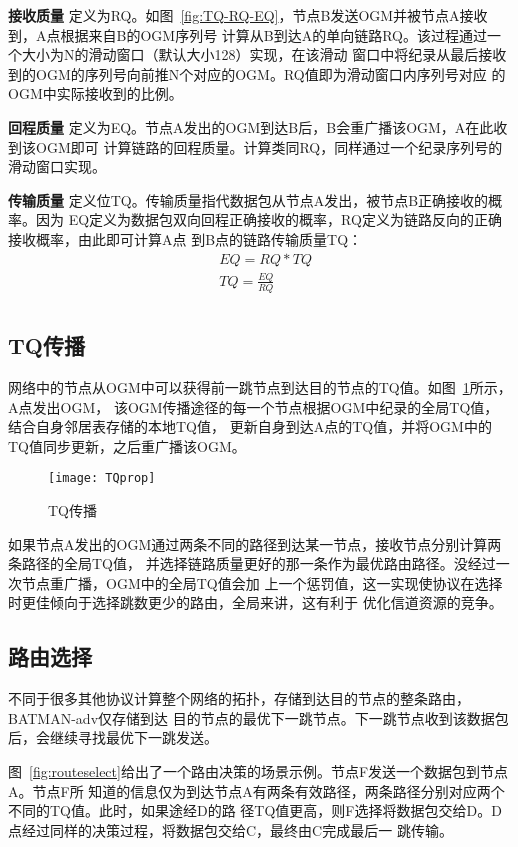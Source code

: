 \textbf{接收质量} 定义为RQ。如图~\ref{fig:TQ-RQ-EQ}，节点B发送OGM并被节点A接收到，A点根据来自B的OGM序列号
计算从B到达A的单向链路RQ。该过程通过一个大小为N的滑动窗口（默认大小128）实现，在该滑动
窗口中将纪录从最后接收到的OGM的序列号向前推N个对应的OGM。RQ值即为滑动窗口内序列号对应
的OGM中实际接收到的比例。

\textbf{回程质量} 定义为EQ。节点A发出的OGM到达B后，B会重广播该OGM，A在此收到该OGM即可
计算链路的回程质量。计算类同RQ，同样通过一个纪录序列号的滑动窗口实现。

\textbf{传输质量} 定义位TQ。传输质量指代数据包从节点A发出，被节点B正确接收的概率。因为
EQ定义为数据包双向回程正确接收的概率，RQ定义为链路反向的正确接收概率，由此即可计算A点
到B点的链路传输质量TQ：
\begin{equation}
\begin{split}
&EQ=RQ*TQ\\
&TQ=\frac{EQ}{RQ}\\
\end{split}
\end{equation}

\subsection{TQ传播}
网络中的节点从OGM中可以获得前一跳节点到达目的节点的TQ值。如图~\ref{fig:TQprop}所示，A点发出OGM，
该OGM传播途径的每一个节点根据OGM中纪录的全局TQ值，结合自身邻居表存储的本地TQ值，
更新自身到达A点的TQ值，并将OGM中的TQ值同步更新，之后重广播该OGM。

\begin{figure}[H] %
  \centering
  \texttt{[image: TQprop]}
  \caption{TQ传播}
  \label{fig:TQprop}
\end{figure}

如果节点A发出的OGM通过两条不同的路径到达某一节点，接收节点分别计算两条路径的全局TQ值，
并选择链路质量更好的那一条作为最优路由路径。没经过一次节点重广播，OGM中的全局TQ值会加
上一个惩罚值，这一实现使协议在选择时更佳倾向于选择跳数更少的路由，全局来讲，这有利于
优化信道资源的竞争。

\subsection{路由选择}
不同于很多其他协议计算整个网络的拓扑，存储到达目的节点的整条路由，BATMAN-adv仅存储到达
目的节点的最优下一跳节点。下一跳节点收到该数据包后，会继续寻找最优下一跳发送。

图~\ref{fig:routeselect}给出了一个路由决策的场景示例。节点F发送一个数据包到节点A。节点F所
知道的信息仅为到达节点A有两条有效路径，两条路径分别对应两个不同的TQ值。此时，如果途经D的路
径TQ值更高，则F选择将数据包交给D。D点经过同样的决策过程，将数据包交给C，最终由C完成最后一
跳传输。

